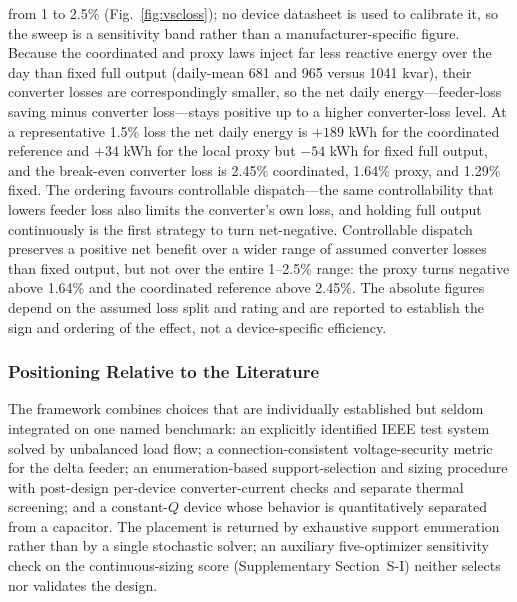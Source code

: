 \documentclass{ieeeaccess}
\begin{document}
{from 1 to 2.5\% (Fig.~\mbox{\ref{fig:vscloss}}); no device datasheet is used to
calibrate it, so the sweep is a sensitivity band rather than a manufacturer-specific
figure. Because the coordinated and proxy laws inject far
less reactive energy over the day than fixed full output (daily-mean \mbox{681} and
\mbox{965} versus \mbox{1041} kvar), their converter losses are correspondingly
smaller, so the net daily energy---feeder-loss saving minus converter loss---stays
positive up to a higher converter-loss level. At a representative \mbox{1.5\%} loss
the net daily energy is \mbox{$+189$} kWh for the coordinated reference and
\mbox{$+34$} kWh for the local proxy but \mbox{$-54$} kWh for fixed full output, and
the break-even converter loss is \mbox{2.45\%} coordinated, \mbox{1.64\%} proxy, and
\mbox{1.29\%} fixed. The ordering favours controllable dispatch---the same
controllability that lowers feeder loss also limits the converter's own loss, and
holding full output continuously is the first strategy to turn net-negative.
Controllable dispatch preserves a positive net benefit over a wider range of assumed
converter losses than fixed output, but not over the entire \mbox{1--2.5\%} range: the
proxy turns negative above \mbox{1.64\%} and the coordinated reference above
\mbox{2.45\%}. The absolute figures depend on the assumed loss
split and rating and are reported to establish the sign and ordering of the effect,
not a device-specific efficiency.}

\subsubsection{Positioning Relative to the Literature}
The framework combines choices that are individually established but seldom
integrated on one named benchmark: an explicitly identified IEEE test system
solved by unbalanced load flow; a connection-consistent voltage-security metric for the
delta feeder; an enumeration-based support-selection and sizing procedure with post-design per-device
converter-current checks and separate thermal screening; and a constant-$Q$
device whose behavior is quantitatively separated from a capacitor. The placement
is returned by exhaustive support enumeration rather than by a single stochastic
solver; an auxiliary five-optimizer sensitivity check on the continuous-sizing
score (Supplementary Section~S-I) neither selects nor validates the design.
\end{document}
